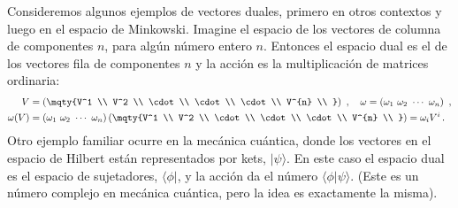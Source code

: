 \documentclass[11pt,b5paper,openany,twoside]{book}
\begin{document}
Consideremos algunos ejemplos de vectores duales, primero en otros contextos y luego en el espacio de Minkowski.
Imagine el espacio de los vectores de columna de componentes $n$, para algún número entero $n$.
Entonces el espacio dual es el de los vectores fila de componentes $n$ y la acción es la multiplicación de matrices ordinaria:
\begin{align}
V &= \left(\mqty{V^1  \\  V^2  \\  \cdot \\  \cdot  \\  \cdot  \\
V^{n} \\ }\right)\ ,\quad
\omega = \left(\omega_1\ \omega_2\ \cdots\ \omega_{n}\right)\ ,\nonumber \\
\omega(V) &= \left(\omega_1\ \omega_2\ \cdots\ \omega_{n}\right)
\left(\mqty{V^1  \\  V^2  \\  \cdot \\  \cdot  \\  \cdot \\
V^{n} \\ }\right) = \omega_i V^i\,. \label{1.39}
\end{align}
Otro ejemplo familiar ocurre en la mecánica cuántica, donde los vectores en el espacio de Hilbert están representados por kets, $|\psi\rangle$.
En este caso el espacio dual es el espacio de sujetadores, $\langle\phi |$, y la acción da el número $\langle \phi |\psi\rangle$.
(Este es un número complejo en mecánica cuántica, pero la idea es exactamente la misma).
\end{document}
